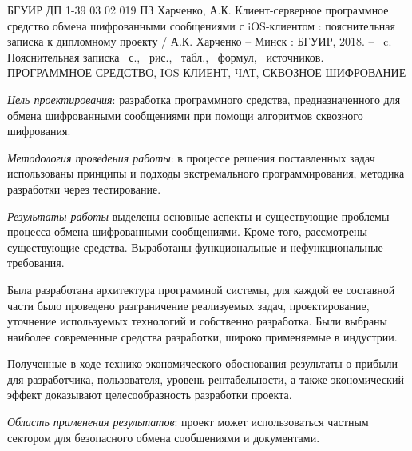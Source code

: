 \thispagestyle{empty}


БГУИР ДП 1-39 03 02 019 ПЗ
\bigbreak
Харченко, А.К. Клиент-серверное программное средство обмена шифрованными сообщениями с iOS-клиентом : пояснительная записка к дипломному проекту / А.К. Харченко -- Минск : БГУИР, 2018. -- \totalpages~c.
\bigbreak
Пояснительная записка \totalpages~с., \totfig{}~рис., \tottab{}~табл., \toteq{}~формул, \totref{}~источников.
\bigbreak
\MakeUppercase{Программное средство, iOS-клиент, чат, сквозное шифрование}
\bigbreak

\textit{Цель проектирования}: разработка программного средства, предназначенного для обмена шифрованными сообщениями при помощи алгоритмов сквозного шифрования. 

\textit{Методология проведения работы}: в процессе решения поставленных задач использованы принципы и подходы экстремального программирования, методика разработки через тестирование.

\textit{Результаты работы} выделены основные аспекты и существующие проблемы процесса обмена шифрованными сообщениями. Кроме того, рассмотрены существующие средства. Выработаны функциональные и нефункциональные требования.

Была разработана архитектура программной системы, для каждой ее составной части было проведено разграничение реализуемых задач, проектирование, уточнение используемых технологий и собственно разработка. Были выбраны наиболее современные средства разработки, широко применяемые в индустрии. 

Полученные в ходе технико-экономического обоснования результаты о прибыли для разработчика, пользователя, уровень рентабельности, а также экономический эффект доказывают целесообразность разработки про\-екта.

\textit{Область применения результатов}: проект может использоваться частным сектором для безопасного обмена сообщениями и документами.